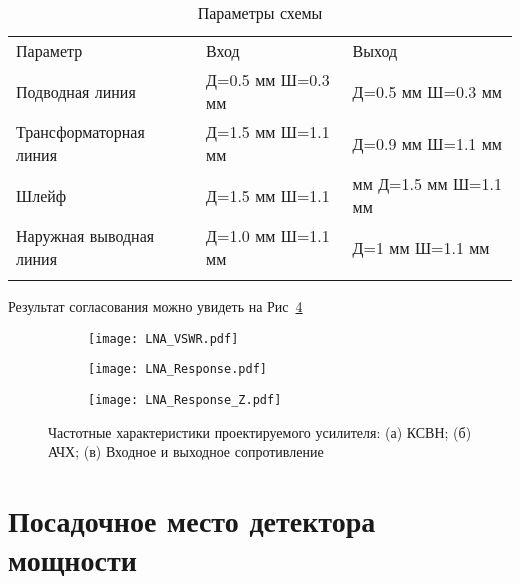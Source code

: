 \begin{table}[!ht]
	\renewcommand{\arraystretch}{2}
	\begin{center}
		\caption{Параметры схемы}\label{tab:LNA-Sch}
		\begin{tabularx}{0.9\textwidth}{!{\vrule width 2pt}*{3}{>{\centering\arraybackslash}X!{\vrule width 2pt}}}
			Параметр & Вход & Выход \\ 
			Подводная линия & Д=0.5 мм Ш=0.3 мм & Д=0.5 мм Ш=0.3 мм \\ \hline
			Трансформаторная линия & Д=1.5 мм Ш=1.1 мм & Д=0.9 мм Ш=1.1 мм \\ \hline
			Шлейф & Д=1.5 мм Ш=1.1 & мм Д=1.5 мм Ш=1.1 мм \\ \hline
			Наружная выводная линия & Д=1.0 мм Ш=1.1 мм & Д=1 мм Ш=1.1 мм
			\\ 
		\end{tabularx}	
	\end{center}
\end{table}

Результат согласования можно увидеть на Рис~\ref{fig:LNA-data}

\begin{figure}[H]
	\captionsetup{singlelinecheck=off, justification=centering}
	\centering
	\begin{subfigure}[b]{0.45\textwidth}
		\centering
		\texttt{[image: LNA\_VSWR.pdf]}
		\caption{}%
		\label{fig:LNA_VSWR}
	\end{subfigure}
	\hfill
	\begin{subfigure}[b]{0.45\textwidth}
		\centering
		\texttt{[image: LNA\_Response.pdf]}
		\caption{}%
		\label{fig:LNA_Response}
	\end{subfigure}
	\hfill
	\begin{subfigure}[b]{0.9\textwidth}
		\centering
		\texttt{[image: LNA\_Response\_Z.pdf]}
		\caption{}%
		\label{fig:LNA_Response_Z}
	\end{subfigure}
	
	\caption{%
		Частотные характеристики проектируемого усилителя:
		(а) КСВН;
		(б) АЧХ;
		(в) Входное и выходное сопротивление
	}%
	\label{fig:LNA-data}
\end{figure}

\section{Посадочное место детектора мощности}

